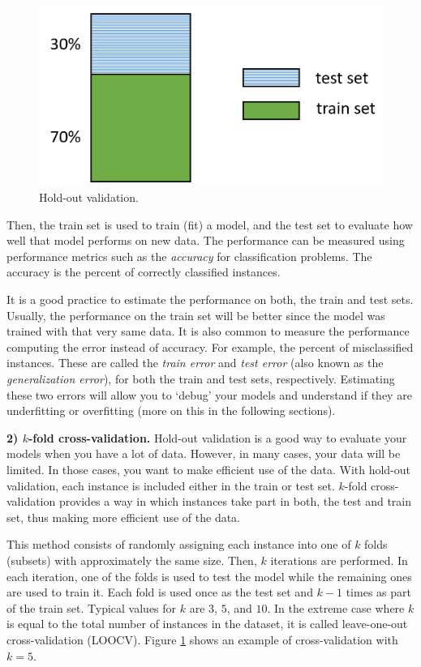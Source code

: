 \documentclass[
  11pt,
]{krantz}
\makeatletter
\newenvironment{kframe}{%
\medskip{}
\setlength{\fboxsep}{.8em}
 \def\at@end@of@kframe{}%
 \ifinner\ifhmode%
  \def\at@end@of@kframe{\end{minipage}}%
  \begin{minipage}{\columnwidth}%
 \fi\fi%
 \def\FrameCommand##1{\hskip\@totalleftmargin \hskip-\fboxsep
 \colorbox{shadecolor}{##1}\hskip-\fboxsep
     \hskip-\linewidth \hskip-\@totalleftmargin \hskip\columnwidth}%
 \MakeFramed {\advance\hsize-\width
   \@totalleftmargin\z@ \linewidth\hsize
   \@setminipage}}%
 {\par\unskip\endMakeFramed%
 \at@end@of@kframe}
\newenvironment{rmdblock}[1]
  {
  \begin{itemize}
  \renewcommand{\labelitemi}{
    \raisebox{-.7\height}[0pt][0pt]{
      {\setkeys{Gin}{width=3em,keepaspectratio}\texttt{[image: images/icons/\#1]}}
    }
  }
  \setlength{\fboxsep}{1em}
  \begin{kframe}
  \item
  }
  {
  \end{kframe}
  \end{itemize}
  }
\newenvironment{rmdgoodpractice}
  {\begin{rmdblock}{goodpractice}}
  {\end{rmdblock}}
\makeatother
\begin{document}
\begin{figure}

{\centering \includegraphics[width=0.7\linewidth]{images/holdout} 

}

\caption{Hold-out validation.}\label{fig:holdout}
\end{figure}

Then, the train set is used to train (fit) a model, and the test set to evaluate how well that model performs on new data. The performance can be measured using performance metrics such as the \emph{accuracy} for classification problems. The accuracy is the percent of correctly classified instances.

\begin{rmdgoodpractice}
It is a good practice to estimate the performance on both, the train and test sets. Usually, the performance on the train set will be better since the model was trained with that very same data. It is also common to measure the performance computing the error instead of accuracy. For example, the percent of misclassified instances. These are called the \emph{train error} and \emph{test error} (also known as the \emph{generalization error}), for both the train and test sets, respectively. Estimating these two errors will allow you to `debug' your models and understand if they are underfitting or overfitting (more on this in the following sections).
\end{rmdgoodpractice}

\textbf{2) \(k\)-fold cross-validation.} Hold-out validation is a good way to evaluate your models when you have a lot of data. However, in many cases, your data will be limited. In those cases, you want to make efficient use of the data. With hold-out validation, each instance is included either in the train or test set. \(k\)-fold cross-validation provides a way in which instances take part in both, the test and train set, thus making more efficient use of the data.

This method consists of randomly assigning each instance into one of \(k\) folds (subsets) with approximately the same size. Then, \(k\) iterations are performed. In each iteration, one of the folds is used to test the model while the remaining ones are used to train it. Each fold is used once as the test set and \(k-1\) times as part of the train set. Typical values for \(k\) are \(3\), \(5\), and \(10\). In the extreme case where \(k\) is equal to the total number of instances in the dataset, it is called leave-one-out cross-validation (LOOCV). Figure \ref{fig:holdout} shows an example of cross-validation with \(k=5\).
\end{document}
